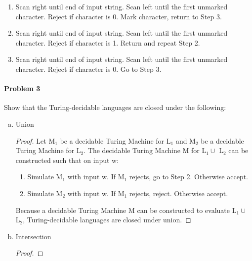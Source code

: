 ﻿\documentclass{article}
\begin{document}
\begin{enumerate}[a)]
\begin{enumerate}[1)]
\begin{enumerate}[(3.a)]
    \item Scan right until end of input string. Scan left until the first unmarked character. Reject if character is 0.  Mark character, return to Step 3.
    
    \item Scan right until end of input string. Scan left until the first unmarked character. Reject if character is 1. Return and repeat Step 2.
    
    \item Scan right until end of input string. Scan left until the first unmarked character. Reject if character is 0. Go to Step 3. 
    

    \end{enumerate}
    


\end{enumerate}


\paragraph{Problem 3} Show that the Turing-decidable languages are closed under the following:
\begin{enumerate}[a)]

\item Union

\begin{proof}

Let M$_{1}$ be a decidable Turing Machine for L$_{1}$ and M$_{2}$ be a decidable Turing Machine for L$_{2}$. The decidable Turing Machine M for L$_{1} \cup$ L$_{2}$ can be constructed such that on input w:

\begin{enumerate} [1.]
\item Simulate M$_{1}$ with input w. If M$_{1}$ rejects, go to Step 2. Otherwise accept.
\item Simulate M$_{2}$ with input w. If M$_{1}$ rejects, reject. Otherwise accept.
\end{enumerate}

Because a decidable Turing Machine M can be constructed to evaluate L$_{1} \cup$ L$_{2}$, Turing-decidable languages are closed under union.

\end{proof}

\item Intersection

\begin{proof}


\end{proof}
\end{enumerate}
\end{enumerate}
\end{document}
